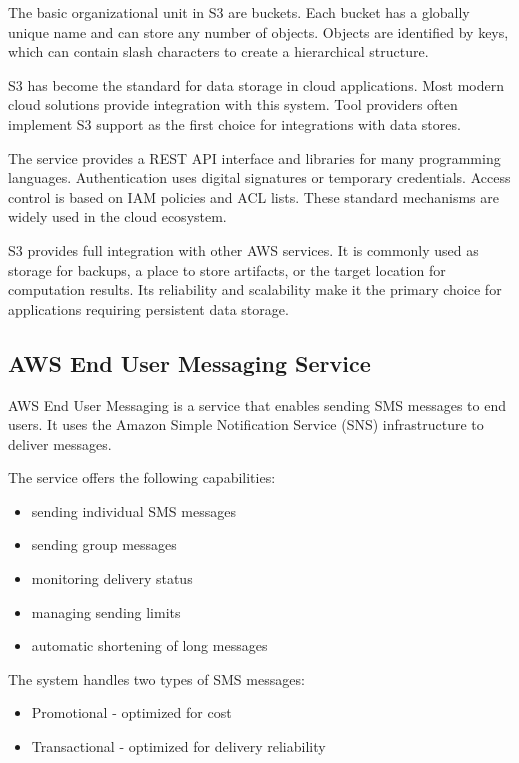 The basic organizational unit in S3 are buckets. Each bucket has a globally unique name and can store any number of objects.
Objects are identified by keys, which can contain slash characters to create a hierarchical structure.

S3 has become the standard for data storage in cloud applications.
Most modern cloud solutions provide integration with this system.
Tool providers often implement S3 support as the first choice for integrations with data stores.

The service provides a REST API interface and libraries for many programming languages.
Authentication uses digital signatures or temporary credentials.
Access control is based on IAM policies and ACL lists. These standard mechanisms are widely used in the cloud ecosystem.

S3 provides full integration with other AWS services. It is commonly used as storage for backups, a place to store artifacts, or the target location for computation results.
Its reliability and scalability make it the primary choice for applications requiring persistent data storage.

\subsection{AWS End User Messaging Service}

AWS End User Messaging is a service that enables sending SMS messages to end users.
It uses the Amazon Simple Notification Service (SNS) infrastructure to deliver messages.

The service offers the following capabilities:
\begin{itemize}
    \item sending individual SMS messages
    \item sending group messages
    \item monitoring delivery status
    \item managing sending limits
    \item automatic shortening of long messages
\end{itemize}

The system handles two types of SMS messages:
\begin{itemize}
    \item Promotional - optimized for cost
    \item Transactional - optimized for delivery reliability
\end{itemize}

